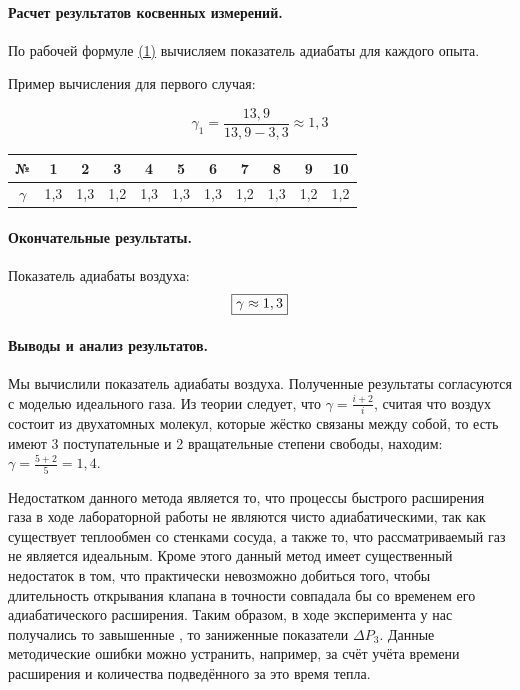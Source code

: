 \documentclass{article}
\begin{document}
\paragraph{Расчет результатов косвенных измерений.}
	По рабочей формуле \hyperlink{formuls}{(1)} вычисляем показатель адиабаты для каждого опыта.
	
	Пример вычисления для первого случая:
	
	$$\gamma_1=\frac{13,9}{13,9-3,3}\approx1,3$$ 
	
		\begin{center}
		\begin{tabular}{c|c| c |c |c |c |c |c |c| c| c|  }
			№&1&2&3&4&5&6&7	&8&9&10\\
			\hline
			$\gamma$& 1,3 & 1,3& 1,2& 1,3& 1,3& 1,3& 1,2& 1,3& 1,2& 1,2
		\end{tabular}
	\end{center}
\paragraph{Окончательные результаты.}
Показатель адиабаты воздуха:
$$\fbox{$\gamma\approx1,3$} $$
\paragraph{Выводы и анализ результатов.}
Мы вычислили показатель адиабаты воздуха. Полученные результаты согласуются с моделью идеального газа. Из теории следует, что  $\gamma=\frac{i+2}{i}$, считая что воздух состоит из двухатомных молекул, которые жёстко связаны между собой, то есть имеют 3 поступательные и 2 вращательные степени свободы, находим: $\gamma=\frac{5+2}{5}=1,4$.

Недостатком данного метода является то, что процессы быстрого расширения газа в ходе лабораторной работы не являются чисто адиабатическими, так как существует теплообмен со стенками сосуда, а также то, что рассматриваемый газ не является идеальным. Кроме этого данный метод имеет существенный недостаток в том, что практически невозможно добиться того, чтобы длительность открывания клапана в точности совпадала бы со временем его адиабатического расширения. Таким образом, в ходе эксперимента у нас получались то завышенные , то заниженные показатели $\Delta P_3$. Данные методические ошибки можно устранить, например, за счёт учёта времени расширения и количества подведённого за это время тепла.
\end{document}
